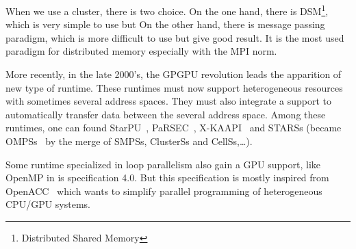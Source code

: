 When we use a cluster, there is two choice.
%
On the one hand, there is DSM\footnote{Distributed Shared Memory}, which is very simple to use but
%
On the other hand, there is message passing paradigm, which is more difficult to use but give good result.
%
It is the most used paradigm for distributed memory especially with the MPI norm.
%

More recently, in the late 2000's, the GPGPU revolution leads the apparition of new type of runtime.
%
These runtimes must now support heterogeneous resources with sometimes several address spaces.
%
They must also integrate a support to automatically transfer data between the several address space.
%
Among these runtimes, one can found StarPU~\cite{starpu}, PaRSEC~\cite{PaRSEC}, X-KAAPI~\cite{xkaapi} and STARSs (became OMPSs~\cite{OMPSs} by the merge of SMPSs, ClusterSs and CellSs,\dots).

Some runtime specialized in loop parallelism also gain a GPU support, like OpenMP in is specification 4.0.
%
But this specification is mostly inspired from OpenACC~\cite{OpenACC} which wants to simplify parallel programming of heterogeneous CPU/GPU systems.
